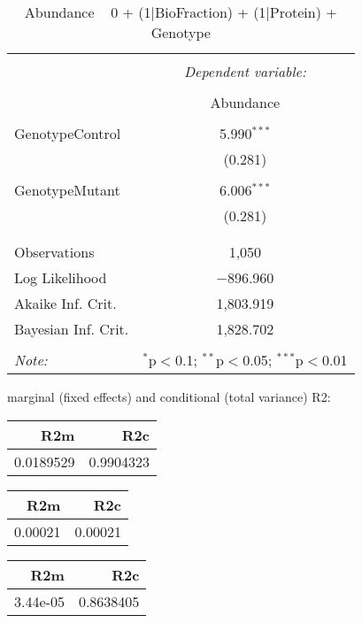 \documentclass[11pt]{report}
\begin{document}
\begin{table}[!htbp] \centering 
  \caption{Abundance ~ 0 + (1|BioFraction) + (1|Protein) + Genotype} 
  \label{} 
\begin{tabular}{@{\extracolsep{5pt}}lc} 
\\[-1.8ex]\hline 
\hline \\[-1.8ex] 
 & \multicolumn{1}{c}{\textit{Dependent variable:}} \\ 
\cline{2-2} 
\\[-1.8ex] & Abundance \\ 
\hline \\[-1.8ex] 
 GenotypeControl & 5.990$^{***}$ \\ 
  & (0.281) \\ 
  & \\ 
 GenotypeMutant & 6.006$^{***}$ \\ 
  & (0.281) \\ 
  & \\ 
\hline \\[-1.8ex] 
Observations & 1,050 \\ 
Log Likelihood & $-$896.960 \\ 
Akaike Inf. Crit. & 1,803.919 \\ 
Bayesian Inf. Crit. & 1,828.702 \\ 
\hline 
\hline \\[-1.8ex] 
\textit{Note:}  & \multicolumn{1}{r}{$^{*}$p$<$0.1; $^{**}$p$<$0.05; $^{***}$p$<$0.01} \\ 
\end{tabular} 
\end{table} 
marginal (fixed effects) and conditional (total variance) R2:

\begin{tabular}{r|r}
\hline
R2m & R2c\\
\hline
0.0189529 & 0.9904323\\
\hline
\end{tabular}

\begin{tabular}{r|r}
\hline
R2m & R2c\\
\hline
0.00021 & 0.00021\\
\hline
\end{tabular}

\begin{tabular}{r|r}
\hline
R2m & R2c\\
\hline
3.44e-05 & 0.8638405\\
\hline
\end{tabular}
\end{document}
